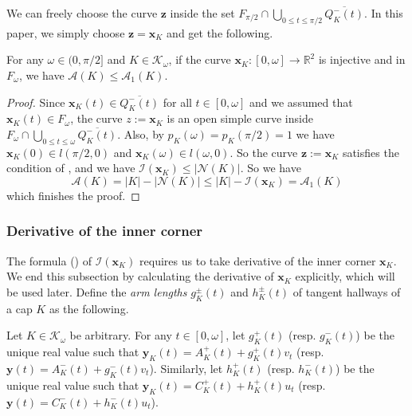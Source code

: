 We can freely choose the curve \(\mathbf{z}\) inside the set \(F_{\pi/2} \cap \bigcup_{0 \leq t \leq \pi/2} \overline{Q^-_K(t)}\). In this paper, we simply choose \(\mathbf{z} = \mathbf{x}_K\) and get the following.

\begin{theorem}

For any \(\omega \in (0, \pi/2]\) and \(K \in \mathcal{K}_{\omega}\), if the curve \(\mathbf{x}_K : [0, \omega] \to \mathbb{R}^2\) is injective and in \(F_\omega\), we have \(\mathcal{A}(K) \leq \mathcal{A}_1(K)\).

\label{thm:a1-upper-bound}
\end{theorem}

\begin{proof}
Since \(\mathbf{x}_K(t) \in \overline{Q_K^-(t)}\) for all \(t \in [0, \omega]\) and we assumed that \(\mathbf{x}_K(t) \in F_\omega\), the curve \(z := \mathbf{x}_K\) is an open simple curve inside \(F_{\omega} \cap \bigcup_{0 \leq t \leq \omega} \overline{Q^-_K(t)}\). Also, by \(p_K(\omega) = p_K(\pi/2) = 1\) we have \(\mathbf{x}_K(0) \in l(\pi/2, 0)\) and \(\mathbf{x}_K(\omega) \in l(\omega, 0)\). So the curve \(\mathbf{z} := \mathbf{x}_K\) satisfies the condition of , and we have \(\mathcal{I}(\mathbf{x}_K) \leq |\mathcal{N}(K)|\). So we have
\[
\mathcal{A}(K) = |K| - |\mathcal{N}(K)| \leq |K| - \mathcal{I}(\mathbf{x}_K) = \mathcal{A}_1(K)
\]
which finishes the proof.
\end{proof}

\subsubsection{Derivative of the inner corner}

The formula () of \(\mathcal{I}(\mathbf{x}_K)\) requires us to take derivative of the inner corner \(\mathbf{x}_K\). We end this subsection by calculating the derivative of \(\mathbf{x}_K\) explicitly, which will be used later. Define the \emph{arm lengths} \(g_K^{\pm}(t)\) and \(h_K^{\pm}(t)\) of tangent hallways of a cap \(K\) as the following.

\begin{definition}

Let \(K \in \mathcal{K}_\omega\) be arbitrary. For any \(t \in [0, \omega]\), let \(g_K^+(t)\) (resp. \(g_K^-(t)\)) be the unique real value such that \(\mathbf{y}_K(t) = A^+_K(t) + g_K^+(t) v_t\) (resp. \(\mathbf{y}(t) = A^-_K(t) + g_K^-(t) v_t\)). Similarly, let \(h_K^+(t)\) (resp. \(h_K^-(t)\)) be the unique real value such that \(\mathbf{y}_K(t) = C^+_K(t) + h_K^+(t) u_t\) (resp. \(\mathbf{y}(t) = C^-_K(t) + h_K^-(t) u_t\)).

\label{def:cap-tangent-arm-length}
\end{definition}

